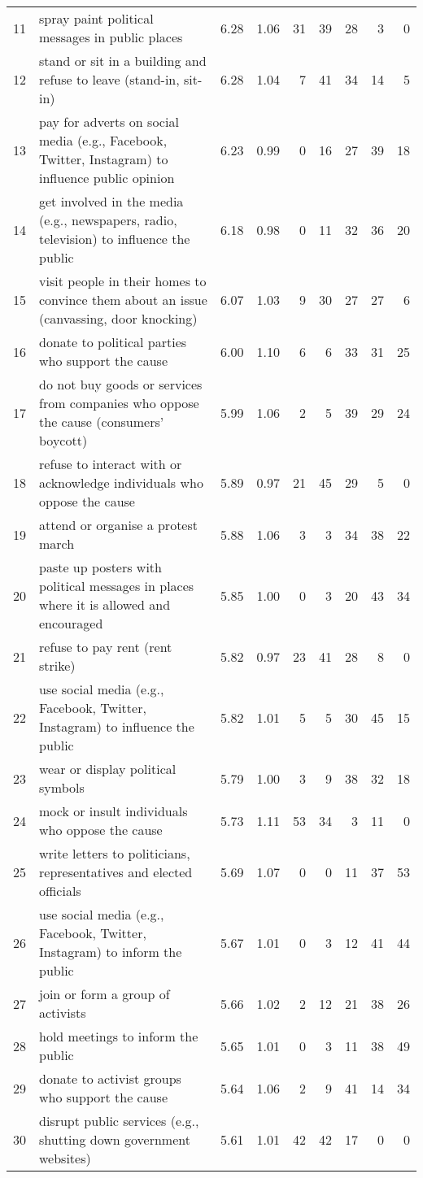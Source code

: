 \documentclass[12pt, letterpaper]{article}
\begin{document}
\begin{xltabular}{\linewidth}{rXrrrrrrr}
11 & spray paint political messages in public places & 6.28 & 1.06 & 31 & 39 & 28 & 3 & 0\\
12 & stand or sit in a building and refuse to leave (stand-in, sit-in) & 6.28 & 1.04 & 7 & 41 & 34 & 14 & 5\\
13 & pay for adverts on social media (e.g., Facebook, Twitter, Instagram) to influence public opinion & 6.23 & 0.99 & 0 & 16 & 27 & 39 & 18\\
14 & get involved in the media (e.g., newspapers, radio, television) to influence the public & 6.18 & 0.98 & 0 & 11 & 32 & 36 & 20\\
15 & visit people in their homes to convince them about an issue (canvassing, door knocking) & 6.07 & 1.03 & 9 & 30 & 27 & 27 & 6\\

16 & donate to political parties who support the cause & 6.00 & 1.10 & 6 & 6 & 33 & 31 & 25\\
17 & do not buy goods or services from companies who oppose the cause (consumers' boycott) & 5.99 & 1.06 & 2 & 5 & 39 & 29 & 24\\
18 & refuse to interact with or acknowledge individuals who oppose the cause & 5.89 & 0.97 & 21 & 45 & 29 & 5 & 0\\
19 & attend or organise a protest march & 5.88 & 1.06 & 3 & 3 & 34 & 38 & 22\\
20 & paste up posters with political messages in places where it is allowed and encouraged & 5.85 & 1.00 & 0 & 3 & 20 & 43 & 34\\

21 & refuse to pay rent (rent strike) & 5.82 & 0.97 & 23 & 41 & 28 & 8 & 0\\
22 & use social media (e.g., Facebook, Twitter, Instagram) to influence the public & 5.82 & 1.01 & 5 & 5 & 30 & 45 & 15\\
23 & wear or display political symbols & 5.79 & 1.00 & 3 & 9 & 38 & 32 & 18\\
24 & mock or insult individuals who oppose the cause & 5.73 & 1.11 & 53 & 34 & 3 & 11 & 0\\
25 & write letters to politicians, representatives and elected officials & 5.69 & 1.07 & 0 & 0 & 11 & 37 & 53\\

26 & use social media (e.g., Facebook, Twitter, Instagram) to inform the public & 5.67 & 1.01 & 0 & 3 & 12 & 41 & 44\\
27 & join or form a group of activists & 5.66 & 1.02 & 2 & 12 & 21 & 38 & 26\\
28 & hold meetings to inform the public & 5.65 & 1.01 & 0 & 3 & 11 & 38 & 49\\
29 & donate to activist groups who support the cause & 5.64 & 1.06 & 2 & 9 & 41 & 14 & 34\\
30 & disrupt public services (e.g., shutting down government websites) & 5.61 & 1.01 & 42 & 42 & 17 & 0 & 0\\


\end{xltabular}
\end{document}
